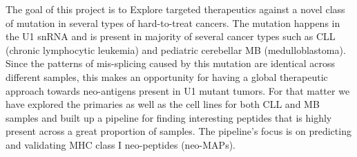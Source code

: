 \documentclass[10pt,letterpaper]{moderncv}
\begin{document}
{}{
The goal of this project is to Explore targeted therapeutics against a novel class of mutation in several types of hard-to-treat cancers. The mutation happens in the U1 snRNA and is present in majority of several cancer types such as CLL (chronic lymphocytic leukemia) and pediatric cerebellar MB (medulloblastoma). Since the patterns of mis-splicing caused by this mutation are identical across different samples, this makes an opportunity for having a global therapeutic approach towards neo-antigens present in U1 mutant tumors.
For that matter we have explored the primaries as well as the cell lines for both CLL and MB samples and built up a pipeline for finding interesting peptides that is highly present across a great proportion of samples. The pipeline's focus is on predicting and validating MHC class I neo-peptides (neo-MAPs).
}
\end{document}
